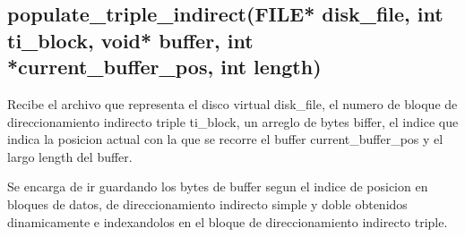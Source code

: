 \documentclass[12pt]{article}
\begin{document}
\subsection{populate\_triple\_indirect(FILE* disk\_file, int ti\_block, void* buffer, int *current\_buffer\_pos, int length)}
Recibe el archivo que representa el disco virtual disk\_file, el numero de bloque de direccionamiento indirecto triple ti\_block, un arreglo de bytes biffer, el indice que indica la posicion actual con la que se recorre el buffer current\_buffer\_pos y el largo length del buffer.

Se encarga de ir guardando los bytes de buffer segun el indice de posicion en bloques de datos, de direccionamiento indirecto simple y doble obtenidos dinamicamente e indexandolos en el bloque de direccionamiento indirecto triple.
\end{document}
